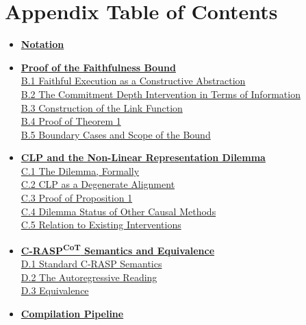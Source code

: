\documentclass[11pt]{article}
\begin{document}
\appendix

\section*{Appendix Table of Contents}
\vspace{-3pt}
{\normalsize\setlength{\leftmargini}{1.8em}
\begin{itemize}[itemsep=4pt,topsep=2pt,leftmargin=*]
\item[\textbf{A}] \hyperref[app:notation]{\textbf{Notation}}
\item[\textbf{B}] \hyperref[app:proof]{\textbf{Proof of the Faithfulness Bound}}\\[1pt]
  \hyperref[app:proof-abstraction]{B.1 Faithful Execution as a Constructive Abstraction}\\
  \hyperref[app:proof-cd]{B.2 The Commitment Depth Intervention in Terms of Information}\\
  \hyperref[app:proof-g]{B.3 Construction of the Link Function}\\
  \hyperref[app:proof-main]{B.4 Proof of Theorem 1}\\
  \hyperref[app:proof-boundary]{B.5 Boundary Cases and Scope of the Bound}
\item[\textbf{C}] \hyperref[app:dilemma]{\textbf{CLP and the Non-Linear Representation Dilemma}}\\[1pt]
  \hyperref[app:dilemma-statement]{C.1 The Dilemma, Formally}\\
  \hyperref[app:dilemma-clp]{C.2 CLP as a Degenerate Alignment}\\
  \hyperref[app:dilemma-proof]{C.3 Proof of Proposition 1}\\
  \hyperref[app:dilemma-others]{C.4 Dilemma Status of Other Causal Methods}\\
  \hyperref[sec:clp-relation]{C.5 Relation to Existing Interventions}
\item[\textbf{D}] \hyperref[app:craspcot]{\textbf{C-RASP\textsuperscript{CoT} Semantics and Equivalence}}\\[1pt]
  \hyperref[app:craspcot-standard]{D.1 Standard C-RASP Semantics}\\
  \hyperref[app:craspcot-auto]{D.2 The Autoregressive Reading}\\
  \hyperref[app:craspcot-equiv]{D.3 Equivalence}
\item[\textbf{E}] \hyperref[app:compile]{\textbf{Compilation Pipeline}}\\[1pt]

\end{itemize}}
\end{document}
